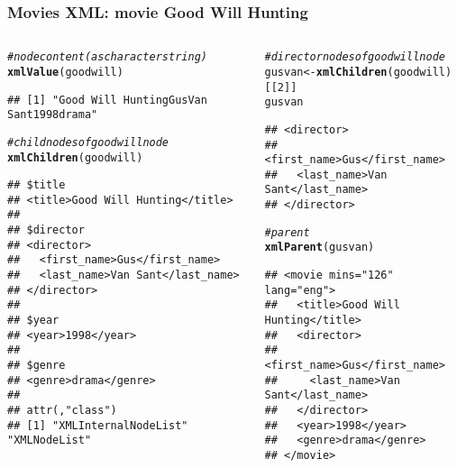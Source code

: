 \documentclass[12pt]{beamer}\usepackage[]{graphicx}\usepackage[]{color}
\makeatletter
\newcommand{\hlnum}[1]{\textcolor[rgb]{0.686,0.059,0.569}{#1}}%
\newcommand{\hlcom}[1]{\textcolor[rgb]{0.678,0.584,0.686}{\textit{#1}}}%
\newcommand{\hlstd}[1]{\textcolor[rgb]{0.345,0.345,0.345}{#1}}%
\newcommand{\hlkwb}[1]{\textcolor[rgb]{0.69,0.353,0.396}{#1}}%
\newcommand{\hlkwd}[1]{\textcolor[rgb]{0.737,0.353,0.396}{\textbf{#1}}}%
\newenvironment{kframe}{%
 \def\at@end@of@kframe{}%
 \ifinner\ifhmode%
  \def\at@end@of@kframe{\end{minipage}}%
  \begin{minipage}{\columnwidth}%
 \fi\fi%
 \def\FrameCommand##1{\hskip\@totalleftmargin \hskip-\fboxsep
 \colorbox{shadecolor}{##1}\hskip-\fboxsep
     \hskip-\linewidth \hskip-\@totalleftmargin \hskip\columnwidth}%
 \MakeFramed {\advance\hsize-\width
   \@totalleftmargin\z@ \linewidth\hsize
   \@setminipage}}%
 {\par\unskip\endMakeFramed%
 \at@end@of@kframe}
\newenvironment{knitrout}{}{} %
\makeatother
\begin{document}
\begin{frame}[fragile]
\frametitle{Movies XML: movie Good Will Hunting}

\begin{columns}[t]
\begin{column}{0.5\textwidth}
\begin{knitrout}\tiny
{}\color{fgcolor}\begin{kframe}
\begin{alltt}
\hlcom{# node content (as character string)}
\hlkwd{xmlValue}\hlstd{(goodwill)}
\end{alltt}
\begin{verbatim}
## [1] "Good Will HuntingGusVan Sant1998drama"
\end{verbatim}
\begin{alltt}
\hlcom{# child nodes of goodwill node}
\hlkwd{xmlChildren}\hlstd{(goodwill)}
\end{alltt}
\begin{verbatim}
## $title
## <title>Good Will Hunting</title> 
## 
## $director
## <director>
##   <first_name>Gus</first_name>
##   <last_name>Van Sant</last_name>
## </director> 
## 
## $year
## <year>1998</year> 
## 
## $genre
## <genre>drama</genre> 
## 
## attr(,"class")
## [1] "XMLInternalNodeList" "XMLNodeList"
\end{verbatim}
\end{kframe}
\end{knitrout}
\end{column}

\begin{column}{0.5\textwidth}
\begin{knitrout}\tiny
{}\color{fgcolor}\begin{kframe}
\begin{alltt}
\hlcom{# director nodes of goodwill node}
\hlstd{gusvan} \hlkwb{<-} \hlkwd{xmlChildren}\hlstd{(goodwill)[[}\hlnum{2}\hlstd{]]}
\hlstd{gusvan}
\end{alltt}
\begin{verbatim}
## <director>
##   <first_name>Gus</first_name>
##   <last_name>Van Sant</last_name>
## </director>
\end{verbatim}
\begin{alltt}
\hlcom{# parent}
\hlkwd{xmlParent}\hlstd{(gusvan)}
\end{alltt}
\begin{verbatim}
## <movie mins="126" lang="eng">
##   <title>Good Will Hunting</title>
##   <director>
##     <first_name>Gus</first_name>
##     <last_name>Van Sant</last_name>
##   </director>
##   <year>1998</year>
##   <genre>drama</genre>
## </movie>
\end{verbatim}
\end{kframe}
\end{knitrout}
\end{column}
\end{columns}

\end{frame}
\end{document}
